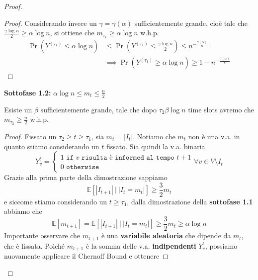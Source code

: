 \begin{teorema}
\begin{proof}
\begin{description}
\begin{lemma}
\begin{proof}
                    Considerando invece un $\gamma = \gamma(\alpha)$ sufficientemente grande, cioè tale che $\frac{\gamma \log n}{2} \geq \alpha \log n$, si ottiene che $m_{\tau_1} \geq \alpha \log n$ w.h.p.
                    \begin{align*}
                        \Pr \left( Y^{(\tau_1)} \leq \alpha \log n \right) &\leq \Pr \left( Y^{(\tau_1)} \leq \frac{\gamma \log n}{2} \right) \leq n^{-\frac{\gamma(\alpha)}{8}} \\
                        & \implies \Pr\left( Y^{(\tau_1)} \geq \alpha \log n \right) \geq 1 - n^{-\frac{\gamma(\alpha)}{8}}
                    \end{align*}
                \end{proof}
            \end{lemma}
            \textbf{Sottofase 1.2: } $\alpha \log n \leq m_t \leq \frac{n}{2}$
            \begin{lemma}
                Esiste un $\beta$ sufficientemente grande, tale che dopo $\tau_2\beta \log n$ time slots avremo che $m_{\tau_2} \geq \frac{n}{2}$ w.h.p.
                \begin{proof}
                    Fissato un $\tau_2 \geq t \geq \tau_1$, sia $m_t = |I_t|$. Notiamo che $m_t$ non è una v.a. in quanto stiamo considerando un $t$ fissato. Sia quindi la v.a. binaria 
                    \[
                        Y^{t}_v = 
                        \begin{cases*}
                            1 \texttt{ if } v \texttt{ risulta è informed al tempo } t + 1 \\
                            0 \texttt{ otherwise}
                        \end{cases*}
                        \forall v \in V \setminus I_t
                    \]
                    Grazie alla prima parte della dimostrazione sappiamo
                    \[
                        \mathbb{E}\left[ |I_{t+1}|\ |\ |I_t = m_t| \right] \geq \frac{3}{2}m_t
                    \]
                    e siccome stiamo considerando un $t \geq \tau_1$, dalla dimostrazione della \textbf{sottofase 1.1} abbiamo che
                    \[
                        \mathbb{E}[m_{t+1}] = \mathbb{E}\left[ |I_{t+1}|\ |\ |I_t = m_t| \right] \geq \frac{3}{2}m_t \geq \alpha \log n 
                    \]
                    Importante osservare che $m_{t+1}$ è una \textbf{variabile aleatoria} che dipende da $m_t$, che è fissata. Poiché $m_{t+1}$ è la somma delle v.a. \textbf{indipendenti} $Y_v^t$, possiamo nuovamente applicare il Chernoff Bound e ottenere

\end{proof}
\end{lemma}
\end{description}
\end{proof}
\end{teorema}
